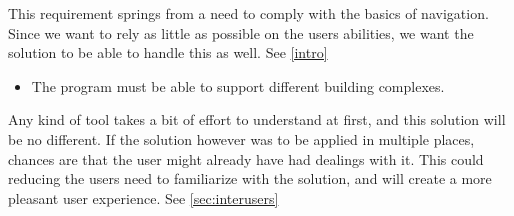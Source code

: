 This requirement springs from a need to comply with the basics of navigation. Since we want to rely as little as possible on the users abilities, we want the solution to be able to handle this as well. See \cref{intro}

\begin{itemize}
	\item The program must be able to support different building complexes.
\end{itemize}

Any kind of tool takes a bit of effort to understand at first, and this solution will be no different. If the solution however was to be applied in multiple places, chances are that the user might already have had dealings with it. This could reducing the users need to familiarize with the solution, and will create a more pleasant user experience. See \cref{sec:interusers}

